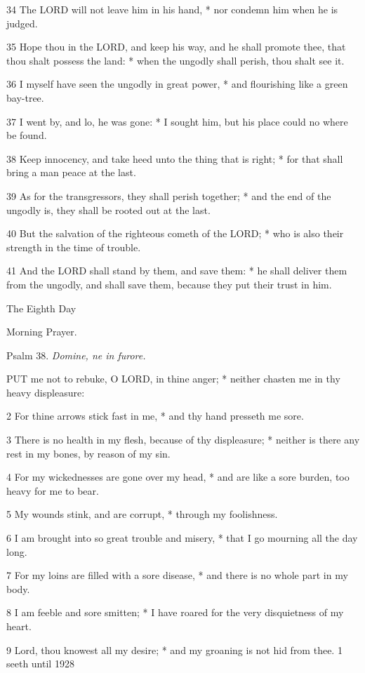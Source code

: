 34 The LORD will not leave him
in his hand, * nor condemn him when he is judged.

35 Hope thou in the LORD, and
keep his way, and he shall promote thee, that thou shalt possess the land:
* when the ungodly shall perish, thou shalt see it.

36 I myself have seen the ungodly in great power, *
and flourishing like a green bay-tree.

37 I went by, and lo, he was gone: * I sought him,
but his place could no where be found.

38 Keep innocency, and take heed unto the thing that
is right; * for that shall bring a man peace at the last.

39 As for the transgressors, they shall perish together;
* and the end of the ungodly is, they shall be rooted out at the last.

40 But the salvation of the righteous cometh of the
LORD; * who is also their strength in the time
of trouble.

41 And the LORD shall stand
by them, and save them: * he shall deliver them from the ungodly, and
shall save them, because they put their trust in him.

The Eighth
Day

Morning
Prayer.

Psalm
38. \emph{Domine, ne in furore.}

PUT
me not to rebuke, O LORD, in thine anger; * neither
chasten me in thy heavy displeasure:

2 For thine arrows stick fast in me, * and thy hand
presseth me sore.

3 There is no health in my flesh, because of thy displeasure;
* neither is there any rest in my bones, by reason of my sin.

4 For my wickednesses are gone over my head, * and
are like a sore burden, too heavy for me to bear.

5 My wounds stink, and are corrupt, * through my foolishness.

6 I am brought into so great trouble and misery, *
that I go mourning all the day long.

7 For my loins are filled with a sore disease, * and
there is no whole part in my body.

8 I am feeble and sore smitten; * I have roared for
the very disquietness of my heart.

9 Lord, thou knowest all my desire; * and my groaning
is not hid from thee. 1 seeth
until
1928

